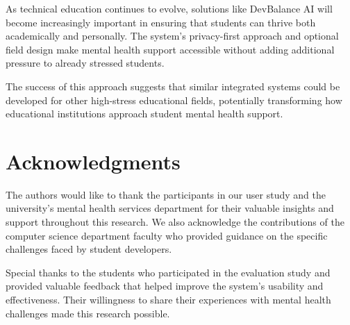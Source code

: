 \documentclass[conference,10pt]{IEEEtran}
\begin{document}
As technical education continues to evolve, solutions like DevBalance AI will become increasingly important in ensuring that students can thrive both academically and personally. The system's privacy-first approach and optional field design make mental health support accessible without adding additional pressure to already stressed students.

The success of this approach suggests that similar integrated systems could be developed for other high-stress educational fields, potentially transforming how educational institutions approach student mental health support.

\section*{Acknowledgments}

The authors would like to thank the participants in our user study and the university's mental health services department for their valuable insights and support throughout this research. We also acknowledge the contributions of the computer science department faculty who provided guidance on the specific challenges faced by student developers.

Special thanks to the students who participated in the evaluation study and provided valuable feedback that helped improve the system's usability and effectiveness. Their willingness to share their experiences with mental health challenges made this research possible.
\end{document}
